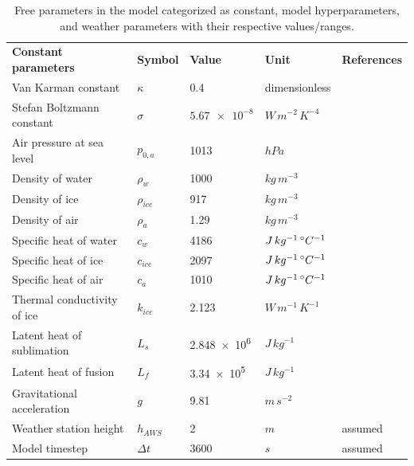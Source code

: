 \documentclass[tc, manuscript]{copernicus}
\begin{document}
\begin{table}
  \caption{Free parameters in the model categorized as constant, model hyperparameters, and weather 
  parameters with their respective values/ranges.}

	\label{tab:parameters}
	\begin{tabular}{lllll}
		\toprule

		\textbf{Constant parameters}                       & \textbf{Symbol} & \textbf{Value} &
    \textbf{Unit} & \textbf{References} \\
    Van Karman constant & $\kappa$      & 0.4        &dimensionless & \citet{cuffeyPhysicsGlaciers2010}              \\
    Stefan Boltzmann constant & $\sigma$ & $\num{5.67 e-8} $& $W\, m^{-2}\, K^{-4}$ & \citet{cuffeyPhysicsGlaciers2010}\\
    Air pressure at sea level & $p_{0,a}$ & 1013 & $hPa$  & \citet{molgAblationAssociatedEnergy2004}\\
    Density of water & $\rho_{w}$ & 1000 & $kg\, m^{-3}$    & \citet{cuffeyPhysicsGlaciers2010}\\
    Density of ice & $\rho_{ice}$ & 917 & $kg\, m^{-3}$ & \citet{cuffeyPhysicsGlaciers2010}\\
    Density of air & $\rho_{a}$ &  1.29 & $kg\, m^{-3}$   & \citet{molgAblationAssociatedEnergy2004}\\
    Specific heat of water & $c_{w}$ & 4186 & $J\, kg^{-1}\,^{\circ} C^{-1}$  & \citet{cuffeyPhysicsGlaciers2010}\\
    Specific heat of ice & $c_{ice}$ & 2097 & $J\, kg^{-1}\,^{\circ} C^{-1}$ & \citet{cuffeyPhysicsGlaciers2010}\\
    Specific heat of air & $c_{a}$ & 1010 & $J\, kg^{-1}\,^{\circ} C^{-1}$ & \citet{molgAblationAssociatedEnergy2004}\\
    Thermal conductivity of ice & $k_{ice}$ & 2.123  & $W\, m^{-1}\, K^{-1}$ & \citet{bonalesThermalConductivityIce2017} \\
    Latent heat of sublimation & $L_{s}$ & \num{2.848e6}  & $J\, kg^{-1}$ &   \citet{cuffeyPhysicsGlaciers2010}\\
    Latent heat of fusion & $L_{f}$ & \num{3.34e5} & $J\, kg^{-1}$ & \citet{cuffeyPhysicsGlaciers2010}\\
    Gravitational acceleration & $g$ & 9.81 & $m\, s^{-2}$ &\citet{cuffeyPhysicsGlaciers2010}\\
    Weather station height & $h_{AWS}$ & 2 & $m$ & assumed \\
    Model timestep                            & $\Delta t$            & $3600$           & $s$ & assumed \\\midrule


\end{tabular}
\end{table}
\end{document}
